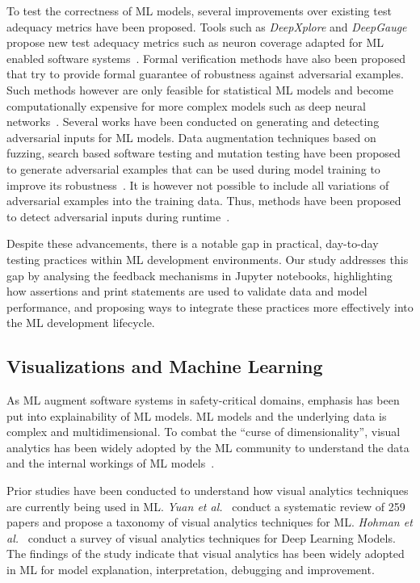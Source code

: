 To test the correctness of ML models, several improvements over existing test adequacy metrics have been proposed. Tools such as \textit{DeepXplore} and \textit{DeepGauge} propose new test adequacy metrics such as neuron coverage adapted for ML enabled software systems~\cite{pei2017deepxplore,ma2018deepgauge,gerasimou2020importance-driven}. Formal verification methods have also been proposed that try to provide formal guarantee of robustness against adversarial examples. Such methods however are only feasible for statistical ML models and become computationally expensive for more complex models such as deep neural networks~\cite{zhu2021deepmemory,baluta2021scalable}. Several works have been conducted on generating and detecting adversarial inputs for ML models. Data augmentation techniques based on fuzzing, search based software testing and mutation testing have been proposed to generate adversarial examples that can be used during model training to improve its robustness~\cite{braiek2019deepevolution,gao2020fuzz,wang2021robot,zhang2020white-box}. It is however not possible to include all variations of adversarial examples into the training data. Thus, methods have been proposed to detect adversarial inputs during runtime~\cite{xiao2021self-checking,wang2020dissector,wang2019adversarial,berend2020cats}.

Despite these advancements, there is a notable gap in practical, day-to-day testing practices within ML development environments. Our study addresses this gap by analysing the feedback mechanisms in Jupyter notebooks, highlighting how assertions and print statements are used to validate data and model performance, and proposing ways to integrate these practices more effectively into the ML development lifecycle.

\subsection{Visualizations and Machine Learning}\label{sec:visualizations}

As ML augment software systems in safety-critical domains, emphasis has been put into explainability of ML models. ML models and the underlying data is complex and multidimensional. To combat the ``curse of dimensionality'', visual analytics has been widely adopted by the ML community to understand the data and the internal workings of ML models~\cite{yuan2021survey,hohman2019visual,wexler2019what-if}.

Prior studies have been conducted to understand how visual analytics techniques are currently being used in ML. \emph{Yuan et al.}~\cite{yuan2021survey} conduct a systematic review of 259 papers and propose a taxonomy of visual analytics techniques for ML. \emph{Hohman et al.}~\cite{hohman2019visual} conduct a survey of visual analytics techniques for Deep Learning Models. The findings of the study indicate that visual analytics has been widely adopted in ML for model explanation, interpretation, debugging and improvement.


